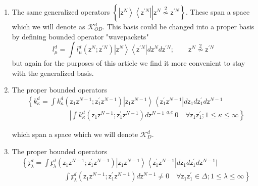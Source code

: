 \documentclass[aps,preprint]{revtex4}%
\begin{document}
\begin{enumerate}
\item The same generalized operators $\left\{  \left\vert \mathsf{z}%
^{N}\right\rangle \left\langle \mathsf{z}^{\prime N}\right\vert \left\vert
\mathsf{z}^{N}\overset{2}{\nsim}\mathsf{z}^{\prime N}\right.  \right\}  $.
These span a space which we will denote as $\mathcal{K}_{OD}^{d}$. This basis
could be changed into a proper basis by defining bounded operator
"wavepackets"
\begin{equation}
l_{\mu}^{d}=%
{\displaystyle\int}
l_{\mu}^{d}\left(  \mathsf{z}^{N};\mathsf{z}^{\prime N}\right)  \left\vert
\mathsf{z}^{N}\right\rangle \left\langle \mathsf{z}^{\prime N}\right\vert
d\mathsf{z}^{N}d\mathsf{z}^{\prime N};\qquad\mathsf{z}^{N}\overset{2}{\nsim
}\mathsf{z}^{\prime N}%
\end{equation}
but again for the purposes of this article we find it more convenient to stay
with the generalized basis.

\item The proper bounded operators%
\begin{align}
&  \left\{  k_{\kappa}^{d}=%
{\displaystyle\int}
k_{\kappa}^{d}\left(  \mathsf{z}_{1}\mathsf{z}^{N-1};\mathsf{z}_{1}^{\prime
}\mathsf{z}^{N-1}\right)  \left\vert \mathsf{z}_{1}\mathsf{z}^{N-1}%
\right\rangle \left\langle \mathsf{z}_{1}^{\prime}\mathsf{z}^{N-1}\right\vert
d\mathsf{z}_{1}d\mathsf{z}_{1}^{\prime}d\mathsf{z}^{N-1}\right. \nonumber\\
&  \qquad\qquad\qquad\left.  \left\vert
{\displaystyle\int}
k_{\kappa}^{d}\left(  \mathsf{z}_{1}\mathsf{z}^{N-1};\mathsf{z}_{1}^{\prime
}\mathsf{z}^{N-1}\right)  d\mathsf{z}^{N-1}\right.  \overset{a.e}{=}%
0\quad\forall\mathsf{z}_{1}\mathsf{z}_{1}^{\prime};1\leq\kappa\leq
\infty\overset{}{}\right\}
\end{align}


which span a space which we will denote $\mathcal{K}_{D}^{d}$.

\item The proper bounded operators%
\begin{align}
&  \left\{  \mathfrak{x}_{\lambda}^{d}=%
{\displaystyle\int}
\mathfrak{x}_{\lambda}^{d}\left(  \mathsf{z}_{1}\mathsf{z}^{N-1}%
;\mathsf{z}_{1}^{\prime}\mathsf{z}^{N-1}\right)  \left\vert \mathsf{z}%
_{1}\mathsf{z}^{N-1}\right\rangle \left\langle \mathsf{z}_{1}^{\prime
}\mathsf{z}^{N-1}\right\vert d\mathsf{z}_{1}d\mathsf{z}_{1}^{\prime
}d\mathsf{z}^{N-1}|\right. \nonumber\\
&  \qquad\qquad\qquad\left.  \int\mathfrak{x}_{\lambda}^{d}\left(
\mathsf{z}_{1}\mathsf{z}^{N-1};\mathsf{z}_{1}^{\prime}\mathsf{z}^{N-1}\right)
d\mathsf{z}^{N-1}\neq0\quad\forall\mathsf{z}_{1}\mathsf{z}_{1}^{\prime}%
\in\Delta;1\leq\lambda\leq\infty\overset{}{}\right\}
\end{align}



\end{enumerate}
\end{document}
